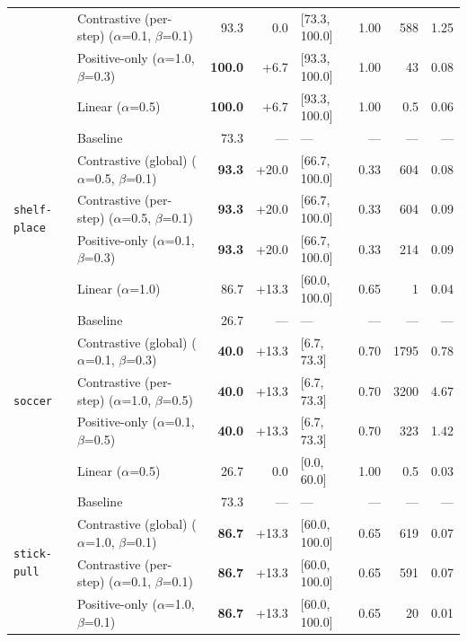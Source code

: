 \begin{table}[p]
{\begin{tabular}{@{}ll r r l r r r@{}}
   & Contrastive (per-step) \scriptsize{($\alpha$=0.1, $\beta$=0.1)} & 93.3 & 0.0 & [73.3, 100.0] & 1.00 & 588 & 1.25 \\
   & Positive-only \scriptsize{($\alpha$=1.0, $\beta$=0.3)} & \textbf{100.0} & +6.7 & [93.3, 100.0] & 1.00 & 43 & 0.08 \\
   & Linear \scriptsize{($\alpha$=0.5)} & \textbf{100.0} & +6.7 & [93.3, 100.0] & 1.00 & 0.5 & 0.06 \\
\midrule
  \multirow{5}{*}{\texttt{shelf-place}} & Baseline & 73.3 & --- & --- & --- & --- & --- \\
   & Contrastive (global) \scriptsize{($\alpha$=0.5, $\beta$=0.1)} & \textbf{93.3} & +20.0 & [66.7, 100.0] & 0.33 & 604 & 0.08 \\
   & Contrastive (per-step) \scriptsize{($\alpha$=0.5, $\beta$=0.1)} & \textbf{93.3} & +20.0 & [66.7, 100.0] & 0.33 & 604 & 0.09 \\
   & Positive-only \scriptsize{($\alpha$=0.1, $\beta$=0.3)} & \textbf{93.3} & +20.0 & [66.7, 100.0] & 0.33 & 214 & 0.09 \\
   & Linear \scriptsize{($\alpha$=1.0)} & 86.7 & +13.3 & [60.0, 100.0] & 0.65 & 1 & 0.04 \\
\midrule
  \multirow{5}{*}{\texttt{soccer}} & Baseline & 26.7 & --- & --- & --- & --- & --- \\
   & Contrastive (global) \scriptsize{($\alpha$=0.1, $\beta$=0.3)} & \textbf{40.0} & +13.3 & [6.7, 73.3] & 0.70 & 1795 & 0.78 \\
   & Contrastive (per-step) \scriptsize{($\alpha$=1.0, $\beta$=0.5)} & \textbf{40.0} & +13.3 & [6.7, 73.3] & 0.70 & 3200 & 4.67 \\
   & Positive-only \scriptsize{($\alpha$=0.1, $\beta$=0.5)} & \textbf{40.0} & +13.3 & [6.7, 73.3] & 0.70 & 323 & 1.42 \\
   & Linear \scriptsize{($\alpha$=0.5)} & 26.7 & 0.0 & [0.0, 60.0] & 1.00 & 0.5 & 0.03 \\
\midrule
  \multirow{5}{*}{\texttt{stick-pull}} & Baseline & 73.3 & --- & --- & --- & --- & --- \\
   & Contrastive (global) \scriptsize{($\alpha$=1.0, $\beta$=0.1)} & \textbf{86.7} & +13.3 & [60.0, 100.0] & 0.65 & 619 & 0.07 \\
   & Contrastive (per-step) \scriptsize{($\alpha$=0.1, $\beta$=0.1)} & \textbf{86.7} & +13.3 & [60.0, 100.0] & 0.65 & 591 & 0.07 \\
   & Positive-only \scriptsize{($\alpha$=1.0, $\beta$=0.1)} & \textbf{86.7} & +13.3 & [60.0, 100.0] & 0.65 & 20 & 0.01 \\

\end{tabular}}
\end{table}
